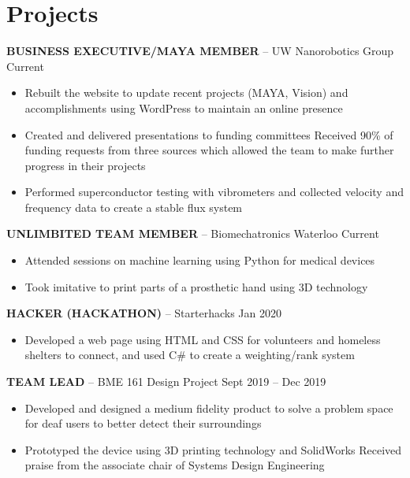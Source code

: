 \documentclass[11pt, a4paper]{awesome-cv}
\providecommand{\tightlist}{%
	\setlength{\itemsep}{0pt}\setlength{\parskip}{0pt}}
\begin{document}
\hypertarget{projects}{%
\section{Projects}\label{projects}}

\textbf{BUSINESS EXECUTIVE/MAYA MEMBER} -- UW Nanorobotics Group Current

\begin{itemize}
\tightlist
\item
  Rebuilt the website to update recent projects (MAYA, Vision) and accomplishments using WordPress to maintain an online presence
\item
  Created and delivered presentations to funding committees
  Received 90\% of funding requests from three sources which allowed the team to make further progress in their projects
\item
  Performed superconductor testing with vibrometers and collected velocity and frequency data to create a stable flux system
\end{itemize}

\textbf{UNLIMBITED TEAM MEMBER} -- Biomechatronics Waterloo Current

\begin{itemize}
\tightlist
\item
  Attended sessions on machine learning using Python for medical devices
\item
  Took imitative to print parts of a prosthetic hand using 3D technology
\end{itemize}

\textbf{HACKER (HACKATHON)} -- Starterhacks Jan 2020

\begin{itemize}
\tightlist
\item
  Developed a web page using HTML and CSS for volunteers and homeless shelters to connect, and used C\# to create a weighting/rank system
\end{itemize}

\textbf{TEAM LEAD} -- BME 161 Design Project Sept 2019 -- Dec 2019

\begin{itemize}
\tightlist
\item
  Developed and designed a medium fidelity product to solve a problem space for deaf users to better detect their surroundings
\item
  Prototyped the device using 3D printing technology and SolidWorks
  Received praise from the associate chair of Systems Design Engineering
\end{itemize}
\end{document}
